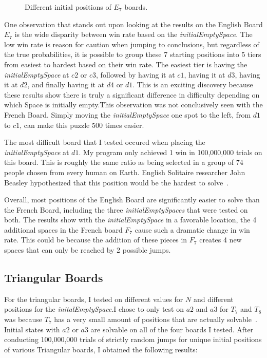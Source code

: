 \documentclass{article}
\begin{document}
\begin{figure}[htb]
\centering
{}
\caption{Different initial positions of $E_7$ boards.}
\label{fig7}
\end{figure} 

One observation that stands out upon looking at the results on the English Board $E_7$ is the wide disparity between win rate based on the \textit{initialEmptySpace}. The low win rate is reason for caution when jumping to conclusions, but regardless of the true probabilities, it is possible to group these 7 starting positions into 5 tiers from easiest to hardest based on their win rate. The easiest tier is having the \textit{initialEmptySpace}  at $c2$ or $c3$, followed by having it at $c1$, having it at $d3$, having it at $d2$, and finally having it at $d4$ or $d1$. This is an exciting discovery because these results show there is truly a significant difference in difficulty depending on which Space is initially empty.This observation was not conclusively seen with the French Board. Simply moving the \textit{initialEmptySpace} one spot to the left, from $d1$ to $c1$, can make this puzzle 500 times easier.

The most difficult board that I tested occured when placing the \textit{initialEmptySpace} at $d1$. My program only achieved 1 win in 100,000,000 trials on this board. This is roughly the same ratio as being selected in a group of 74 people chosen from every human on Earth. English Solitaire researcher John Beasley hypothesized that this position would be the hardest to solve~\cite{Beasley}.

Overall, most positions of the English Board are significantly easier to solve than the French Board, including the three \textit{initialEmptySpaces} that were tested on both. The results show with the \textit{initialEmptySpace} in a favorable location, the 4 additional spaces in the French board $F_7$ cause such a dramatic change in win rate. This could be because the addition of these pieces in $F_7$ creates 4 new spaces that can only be reached by 2 possible jumps.

\subsection{Triangular Boards}
\label{3.3Triangular}
For the triangular boards, I tested on different values for $N$ and different positions for the \textit{initalEmptySpace}.I chose to only test on $a2$ and $a3$ for $T_7$ and $T_8$ was because $T_7$ has a very small amount of positions that are actually solvable~\cite{Bell}. Initial states with $a2$ or $a3$ are solvable on all of the four boards I tested. After conducting 100,000,000 trials of strictly random jumps for unique initial positions of various Triangular boards, I obtained the following results:
\end{document}
